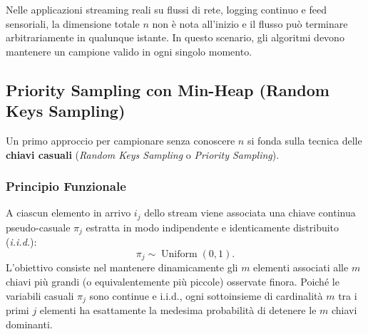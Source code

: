 Nelle applicazioni streaming reali su flussi di rete, logging continuo e feed sensoriali, la dimensione totale $n$ non è nota all'inizio e il flusso può terminare arbitrariamente in qualunque istante. In questo scenario, gli algoritmi devono mantenere un campione valido in ogni singolo momento.

\FloatBarrier
\subsection{Priority Sampling con Min-Heap (Random Keys Sampling)}
Un primo approccio per campionare senza conoscere $n$ si fonda sulla tecnica delle \textbf{chiavi casuali} (\textit{Random Keys Sampling} o \textit{Priority Sampling}).

\subsubsection{Principio Funzionale}
A ciascun elemento in arrivo $i_j$ dello stream viene associata una chiave continua pseudo-casuale $\pi_j$ estratta in modo indipendente e identicamente distribuito (\textit{i.i.d.}):
\begin{equation}
  \pi_j \sim \operatorname{Uniform}(0, 1).
\end{equation}
L'obiettivo consiste nel mantenere dinamicamente gli $m$ elementi associati alle $m$ chiavi più grandi (o equivalentemente più piccole) osservate finora. Poiché le variabili casuali $\pi_j$ sono continue e i.i.d., ogni sottoinsieme di cardinalità $m$ tra i primi $j$ elementi ha esattamente la medesima probabilità di detenere le $m$ chiavi dominanti.


